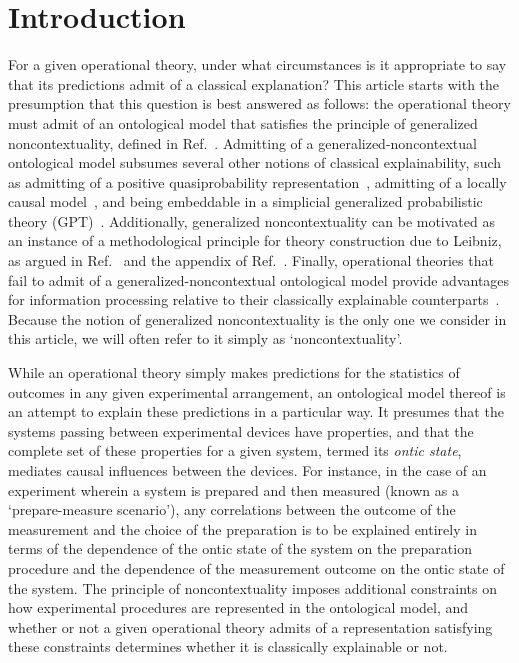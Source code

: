 \documentclass[10pt,twocolumn,aps,groupedaddress,nofootinbib]{revtex4}
\begin{document}
\maketitle

{
  \hypersetup{linkcolor=purple}
  \tableofcontents
}

\section{Introduction}

For a given operational theory, under what circumstances is it appropriate to say that its predictions admit of a classical explanation? This article starts with the presumption that this question is best answered as follows:
the operational theory must admit of an ontological model that satisfies the principle of generalized noncontextuality, defined in Ref.~\cite{Spekkens2005}.
Admitting of a generalized-noncontextual ontological model subsumes several other notions of classical explainability,
such as admitting of a positive quasiprobability representation~\cite{Spekkens2008,ferrie2008frame}, admitting of a locally causal model~\cite{Bell,Bellreview}, and being embeddable in a simplicial generalized probabilistic theory (GPT)~\cite{schmid2019characterization,shahandeh2019contextuality}.   Additionally, generalized noncontextuality can be motivated as an instance of a methodological principle for theory construction due to Leibniz, as argued in Ref.~\cite{Leibniz} and the appendix of Ref.~\cite{Mazurek2016}.
Finally, operational theories that fail to admit of a generalized-noncontextual ontological model provide advantages for information processing relative to their classically explainable counterparts~\cite{POM,RAC,RAC2,Saha_2019,saha2019preparation,MESD,Lostaglio2020contextualadvantage,magic,comp1,comp2}.  Because the notion of generalized noncontextuality is the only one we consider in this article, we will often refer to it simply as `noncontextuality'.


While an operational theory simply makes predictions for the statistics of outcomes in any given experimental arrangement, an ontological model thereof is an attempt to explain these predictions in a particular way.  It presumes that the systems passing between experimental devices have properties, and that the complete set of these properties for a given system, termed its {\em ontic state}, mediates causal influences between the devices.  For instance, in the case of an experiment wherein a system is prepared and then measured (known as a `prepare-measure scenario'), any correlations between the outcome of the measurement and the choice of the preparation is to be explained entirely in terms of the dependence of the ontic state of the system on the preparation procedure and the dependence of the measurement outcome on the ontic state of the system.
The principle of noncontextuality imposes additional constraints on how experimental procedures are represented in the ontological model, and whether or not a given operational theory admits of a representation satisfying these constraints determines whether it is classically explainable or not.
\end{document}
